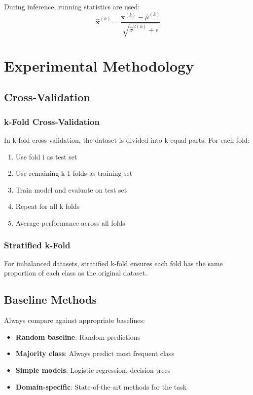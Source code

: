\documentclass{article}
\begin{document}
During inference, running statistics are used:
\[
\hat{\mathbf{x}}^{(k)} = \frac{\mathbf{x}^{(k)} - \hat{\mu}^{(k)}}{\sqrt{\hat{\sigma}^{2(k)} + \epsilon}}
\]

\section{Experimental Methodology}

\subsection{Cross-Validation}

\subsubsection{k-Fold Cross-Validation}

In k-fold cross-validation, the dataset is divided into k equal parts.
For each fold:

\begin{enumerate}
\item Use fold i as test set
\item Use remaining k-1 folds as training set
\item Train model and evaluate on test set
\item Repeat for all k folds
\item Average performance across all folds
\end{enumerate}

\subsubsection{Stratified k-Fold}

For imbalanced datasets, stratified k-fold ensures each fold has the
same proportion of each class as the original dataset.

\subsection{Baseline Methods}

Always compare against appropriate baselines:

\begin{itemize}
\item \textbf{Random baseline}: Random predictions
\item \textbf{Majority class}: Always predict most frequent class
\item \textbf{Simple models}: Logistic regression, decision trees
\item \textbf{Domain-specific}: State-of-the-art methods for the task
\end{itemize}
\end{document}
